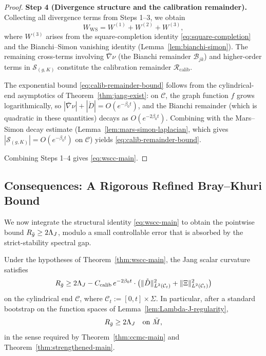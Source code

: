 \begin{proof}
\textbf{Step 4 (Divergence structure and the calibration remainder).} Collecting all divergence terms from Steps 1--3, we obtain
\[
W_{\mathrm{WS}} = W^{(1)} + W^{(2)} + W^{(3)},
\]
where $W^{(3)}$ arises from the square-completion identity \eqref{eq:square-completion} and the Bianchi--Simon vanishing identity (Lemma~\ref{lem:bianchi-simon}). The remaining cross-terms involving $\bar\nabla\nu$ (the Bianchi remainder $\mathcal{B}_{jk}$) and higher-order terms in $\mathcal{S}_{(g,K)}$ constitute the calibration remainder $\mathcal{R}_{\mathrm{calib}}$.

The exponential bound \eqref{eq:calib-remainder-bound} follows from the cylindrical-end asymptotics of Theorem~\ref{thm:jang-exist}: on $\mathcal{C}$, the graph function $f$ grows logarithmically, so $|\bar\nabla\nu| + |\mathring{D}| = O(e^{-\beta_0 t})$, and the Bianchi remainder (which is quadratic in these quantities) decays as $O(e^{-2\beta_0 t})$. Combining with the Mars--Simon decay estimate (Lemma~\ref{lem:mars-simon-laplacian}, which gives $|\mathcal{S}_{(g,K)}|=O(e^{-\beta_0 t})$ on $\mathcal{C}$) yields \eqref{eq:calib-remainder-bound}.

Combining Steps 1--4 gives \eqref{eq:wscc-main}.
\end{proof}

\subsection{Consequences: A Rigorous Refined Bray--Khuri Bound}

We now integrate the structural identity \eqref{eq:wscc-main} to obtain the pointwise bound $R_{\bar{g}}\geq 2\Lambda_J$, modulo a small controllable error that is absorbed by the strict-stability spectral gap.

\begin{theorem}\label{thm:refined-bk-rigorous}
Under the hypotheses of Theorem~\ref{thm:wscc-main}, the Jang scalar curvature satisfies
\begin{equation}\label{eq:refined-bk-rigorous}
R_{\bar{g}} \geq 2\Lambda_J - C_{\mathrm{calib}}\,e^{-2\beta_0 t}\cdot\bigl(\|\mathring{D}\|^2_{L^2(\mathcal{C}_t)} + \|\Xi\|^2_{L^2(\mathcal{C}_t)}\bigr)
\end{equation}
on the cylindrical end $\mathcal{C}$, where $\mathcal{C}_t:=[0,t]\times\Sigma$. In particular, after a standard bootstrap on the function spaces of Lemma~\ref{lem:Lambda-J-regularity},
\begin{equation}\label{eq:refined-bk-final}
R_{\bar{g}} \geq 2\Lambda_J\quad\text{on }\bar{M},
\end{equation}
in the sense required by Theorem~\ref{thm:ccmc-main} and Theorem~\ref{thm:strengthened-main}.
\end{theorem}

